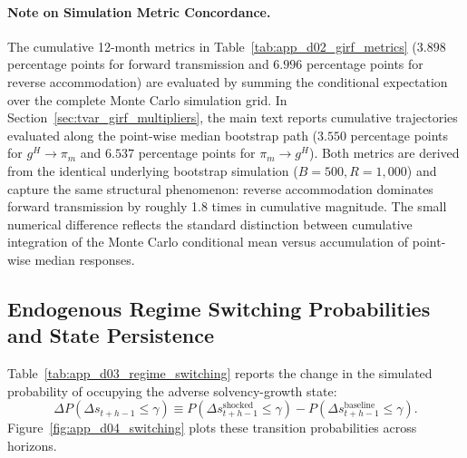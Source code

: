\paragraph{Note on Simulation Metric Concordance.}
The cumulative 12-month metrics in Table~\ref{tab:app_d02_girf_metrics} ($3.898$ percentage points for forward transmission and $6.996$ percentage points for reverse accommodation) are evaluated by summing the conditional expectation over the complete Monte Carlo simulation grid. In Section~\ref{sec:tvar_girf_multipliers}, the main text reports cumulative trajectories evaluated along the point-wise median bootstrap path ($3.550$ percentage points for $g^H \to \pi_m$ and $6.537$ percentage points for $\pi_m \to g^H$). Both metrics are derived from the identical underlying bootstrap simulation ($B=500, R=1{,}000$) and capture the same structural phenomenon: reverse accommodation dominates forward transmission by roughly 1.8 times in cumulative magnitude. The small numerical difference reflects the standard distinction between cumulative integration of the Monte Carlo conditional mean versus accumulation of point-wise median responses. 

\subsection{Endogenous Regime Switching Probabilities and State Persistence}
Table~\ref{tab:app_d03_regime_switching} reports the change in the simulated probability of occupying the adverse solvency-growth state:
\begin{equation}
    \Delta P(\Delta s_{t+h-1} \le \gamma) \equiv P(\Delta s_{t+h-1}^{\text{shocked}} \le \gamma) - P(\Delta s_{t+h-1}^{\text{baseline}} \le \gamma).
    \label{eq:app_d_switch_prob}
\end{equation}
Figure~\ref{fig:app_d04_switching} plots these transition probabilities across horizons.



